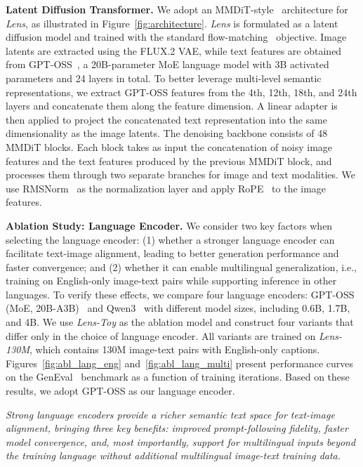 \documentclass{llmxive}
\begin{document}
\noindent\textbf{Latent Diffusion Transformer.}
We adopt an MMDiT-style~\citep{esser2024scaling} architecture for \textit{Lens}, as illustrated in Figure~\ref{fig:architecture}. \textit{Lens} is formulated as a latent diffusion model and trained with the standard flow-matching~\citep{lipman2023flow} objective. Image latents are extracted using the FLUX.2 VAE, while text features are obtained from GPT-OSS~\citep{openai2025gptoss120bgptoss20bmodel}, a 20B-parameter MoE language model with 3B activated parameters and 24 layers in total. To better leverage multi-level semantic representations, we extract GPT-OSS features from the 4th, 12th, 18th, and 24th layers and concatenate them along the feature dimension. A linear adapter is then applied to project the concatenated text representation into the same dimensionality as the image latents. The denoising backbone consists of 48 MMDiT blocks. Each block takes as input the concatenation of noisy image features and the text features produced by the previous MMDiT block, and processes them through two separate branches for image and text modalities. We use RMSNorm~\citep{zhang2019root} as the normalization layer and apply RoPE~\citep{su2024roformer} to the image features.




\noindent\textbf{Ablation Study: Language Encoder.}
We consider two key factors when selecting the language encoder: (1) whether a stronger language encoder can facilitate text-image alignment, leading to better generation performance and faster convergence; and (2) whether it can enable multilingual generalization, i.e., training on English-only image-text pairs while supporting inference in other languages. To verify these effects, we compare four language encoders: GPT-OSS (MoE, 20B-A3B)~\citep{openai2025gptoss120bgptoss20bmodel} and Qwen3~\citep{yang2025qwen3} with different model sizes, including 0.6B, 1.7B, and 4B. We use \textit{Lens-Toy} as the ablation model and construct four variants that differ only in the choice of language encoder. All variants are trained on \textit{Lens-130M}, which contains 130M image-text pairs with English-only captions. Figures~\ref{fig:abl_lang_eng} and~\ref{fig:abl_lang_multi} present performance curves on the GenEval~\citep{ghosh2023geneval} benchmark as a function of training iterations. Based on these results, we adopt GPT-OSS as our language encoder.

\begin{tcolorbox}[colback=gray!5,colframe=black]
\textit{Strong language encoders provide a richer semantic text space for text-image alignment, bringing three key benefits: improved prompt-following fidelity, faster model convergence, and, most importantly, support for multilingual inputs beyond the training language without additional multilingual image-text training data.}
\end{tcolorbox}
\end{document}
